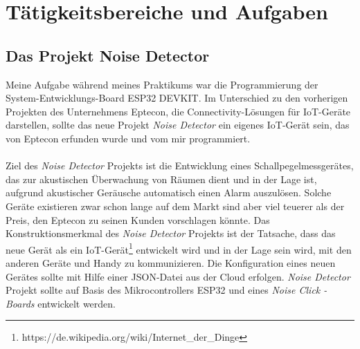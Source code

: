\chapter{Tätigkeitsbereiche und Aufgaben}
\label{sec:main}
\section{Das Projekt Noise Detector}
\label{sec:main:overview}
Meine Aufgabe während meines Praktikums war die Programmierung der System-Entwicklungs-Board ESP32 DEVKIT. Im Unterschied zu den vorherigen Projekten des Unternehmens Eptecon, die Connectivity-Lösungen für IoT-Geräte darstellen, sollte das neue Projekt \textit{Noise Detector} ein eigenes IoT-Gerät sein, das von Eptecon erfunden wurde und vom mir programmiert. \\\\
Ziel des \textit{Noise Detector} Projekts ist die Entwicklung eines Schallpegelmessgerätes, das zur akustischen Überwachung von Räumen dient und in der Lage ist, aufgrund akustischer Geräusche automatisch einen Alarm auszulösen. Solche Geräte existieren zwar schon lange auf dem Markt sind aber viel teuerer als der Preis, den Eptecon zu seinen Kunden vorschlagen könnte. Das Konstruktionsmerkmal des \textit{Noise Detector} Projekts ist der Tatsache, dass das neue Gerät als ein IoT-Gerät\footnote{https://de.wikipedia.org/wiki/Internet\_der\_Dinge} entwickelt wird und in der Lage sein wird, mit den anderen Geräte und Handy zu kommunizieren. Die Konfiguration eines neuen Gerätes sollte mit Hilfe einer JSON-Datei aus der Cloud erfolgen. \textit{Noise Detector} Projekt sollte auf Basis des Mikrocontrollers ESP32 und eines \textit{Noise Click - Boards} entwickelt werden.

